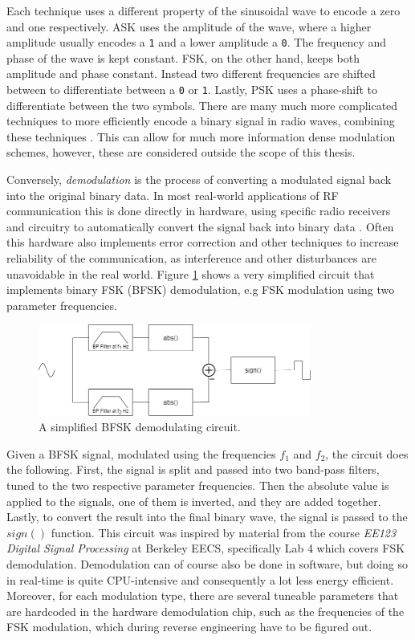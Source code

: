 Each technique uses a different property of the sinusoidal wave to encode a zero and one respectively. \gls{ASK} uses the amplitude of the wave, where a higher amplitude usually encodes a \texttt{1} and a lower amplitude a \texttt{0}. The frequency and phase of the wave is kept constant. \gls{FSK}, on the other hand, keeps both amplitude and phase constant. Instead two different frequencies are shifted between to differentiate between a \texttt{0} or \texttt{1}. Lastly, \gls{PSK} uses a phase-shift to differentiate between the two symbols. There are many much more complicated techniques to more efficiently encode a binary signal in radio waves, combining these techniques \cite{rf-modulation}. This can allow for much more information dense modulation schemes, however, these are considered outside the scope of this thesis.

Conversely, \textit{demodulation} is the process of converting a modulated signal back into the original binary data. In most real-world applications of RF communication this is done directly in hardware, using specific radio receivers and circuitry to automatically convert the signal back into binary data \cite{rf-modulation}. Often this hardware also implements error correction and other techniques to increase reliability of the communication, as interference and other disturbances are unavoidable in the real world. Figure \ref{fig:bfsk-demodulator} shows a very simplified circuit that implements binary FSK (BFSK) demodulation, e.g FSK modulation using two parameter frequencies.
\begin{figure}[!ht]
    \centering
    \includegraphics[width=0.8\textwidth]{images/6-pentesting/bfsk-demodulator.png}
    \caption{A simplified BFSK demodulating circuit.}
    \label{fig:bfsk-demodulator}
\end{figure}

Given a BFSK signal, modulated using the frequencies $f_1$ and $f_2$, the circuit does the following. First, the signal is split and passed into two band-pass filters, tuned to the two respective parameter frequencies. Then the absolute value is applied to the signals, one of them is inverted, and they are added together. Lastly, to convert the result into the final binary wave, the signal is passed to the $sign()$ function. This circuit was inspired by material from the course \textit{EE123 Digital Signal Processing} at Berkeley EECS, specifically Lab 4 which covers FSK demodulation. Demodulation can of course also be done in software, but doing so in real-time is quite CPU-intensive and consequently a lot less energy efficient. Moreover, for each modulation type, there are several tuneable parameters that are hardcoded in the hardware demodulation chip, such as the frequencies of the FSK modulation, which during reverse engineering have to be figured out.

